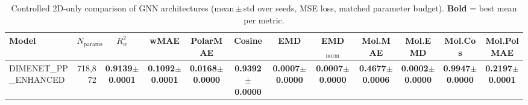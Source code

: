 \begin{table}[ht]
\centering
\caption{Controlled 2D-only comparison of GNN architectures (mean\,$\pm$\,std over seeds, MSE loss, matched parameter budget). \textbf{Bold} = best mean per metric.}
\label{tab:benchmark_2d_mse}
\small
\begin{tabular}{l r c c c c c c c c c c }
\toprule
Model & $N_{\text{params}}$ & $R^2_w$ & wMAE & PolarMAE & Cosine & EMD & EMD$_\mathrm{norm}$ & Mol.MAE & Mol.EMD & Mol.Cos & Mol.PolMAE \\
\midrule
DIMENET_PP_ENHANCED & 718,872 & \textbf{0.9139$\pm$0.0001} & \textbf{0.1092$\pm$0.0001} & \textbf{0.0168$\pm$0.0000} & \textbf{0.9392$\pm$0.0000} & \textbf{0.0007$\pm$0.0000} & \textbf{0.0007$\pm$0.0000} & \textbf{0.4677$\pm$0.0006} & \textbf{0.0002$\pm$0.0000} & \textbf{0.9947$\pm$0.0000} & \textbf{0.2197$\pm$0.0001} \\
\bottomrule
\end{tabular}
\end{table}
